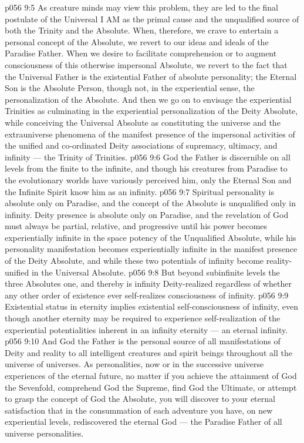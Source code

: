 \vs p056 9:5 As creature minds may view this problem, they are led to the final postulate of the Universal I AM as the primal cause and the unqualified source of both the Trinity and the Absolute. When, therefore, we crave to entertain a personal concept of the Absolute, we revert to our ideas and ideals of the Paradise Father. When we desire to facilitate comprehension or to augment consciousness of this otherwise impersonal Absolute, we revert to the fact that the Universal Father is the existential Father of absolute personality; the Eternal Son is the Absolute Person, though not, in the experiential sense, the personalization of the Absolute. And then we go on to envisage the experiential Trinities as culminating in the experiential personalization of the Deity Absolute, while conceiving the Universal Absolute as constituting the universe and the extrauniverse phenomena of the manifest presence of the impersonal activities of the unified and co\hyp{}ordinated Deity associations of supremacy, ultimacy, and infinity --- the Trinity of Trinities.
\vs p056 9:6 \pc God the Father is discernible on all levels from the finite to the infinite, and though his creatures from Paradise to the evolutionary worlds have variously perceived him, only the Eternal Son and the Infinite Spirit know him as an infinity.
\vs p056 9:7 Spiritual personality is absolute only on Paradise, and the concept of the Absolute is unqualified only in infinity. Deity presence is absolute only on Paradise, and the revelation of God must always be partial, relative, and progressive until his power becomes experientially infinite in the space potency of the Unqualified Absolute, while his personality manifestation becomes experientially infinite in the manifest presence of the Deity Absolute, and while these two potentials of infinity become reality\hyp{}unified in the Universal Absolute.
\vs p056 9:8 But beyond subinfinite levels the three Absolutes  one, and thereby is infinity Deity\hyp{}realized regardless of whether any other order of existence ever self\hyp{}realizes consciousness of infinity.
\vs p056 9:9 Existential status in eternity implies existential self\hyp{}consciousness of infinity, even though another eternity may be required to experience self\hyp{}realization of the experiential potentialities inherent in an infinity eternity --- an eternal infinity.
\vs p056 9:10 \pc And God the Father is the personal source of all manifestations of Deity and reality to all intelligent creatures and spirit beings throughout all the universe of universes. As personalities, now or in the successive universe experiences of the eternal future, no matter if you achieve the attainment of God the Sevenfold, comprehend God the Supreme, find God the Ultimate, or attempt to grasp the concept of God the Absolute, you will discover to your eternal satisfaction that in the consummation of each adventure you have, on new experiential levels, rediscovered the eternal God --- the Paradise Father of all universe personalities.
